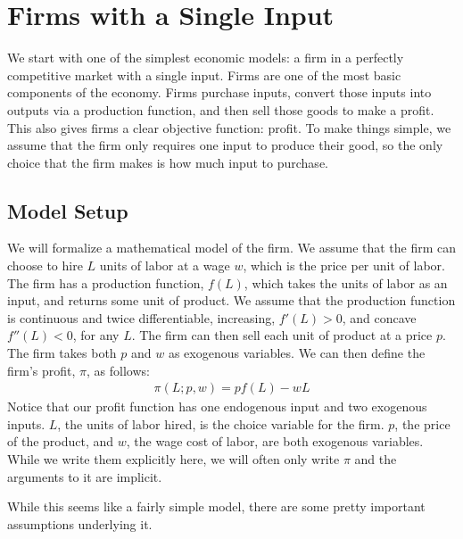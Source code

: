 \chapter{Firms with a Single Input}
We start with one of the simplest economic models: a firm in a perfectly competitive market with a single input. Firms are one of the most basic components of the economy. Firms purchase inputs, convert those inputs into outputs via a production function, and then sell those goods to make a profit. This also gives firms a clear objective function: profit. To make things simple, we assume that the firm only requires one input to produce their good, so the only choice that the firm makes is how much input to purchase. 

\section{Model Setup}
We will formalize a mathematical model of the firm. We assume that the firm can choose to hire $L$ units of labor at a wage $w$, which is the price per unit of labor. The firm has a production function, $f(L)$, which takes the units of labor as an input, and returns some unit of product. We assume that the production function is continuous and twice differentiable, increasing, $f'(L) > 0$, and concave $f''(L) < 0$, for any $L$. The firm can then sell each unit of product at a price $p$. The firm takes both $p$ and $w$ as exogenous variables. We can then define the firm's profit, $\pi$, as follows:
\begin{align}
    \pi(L; p, w) = p f(L) - w L \label{eq:profit_def}
\end{align}
Notice that our profit function has one endogenous input and two exogenous inputs. $L$, the units of labor hired, is the choice variable for the firm. $p$, the price of the product, and $w$, the wage cost of labor, are both exogenous variables. While we write them explicitly here, we will often only write $\pi$ and the arguments to it are implicit. 

While this seems like a fairly simple model, there are some pretty important assumptions underlying it.


